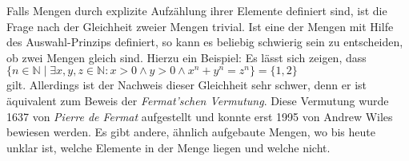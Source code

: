Falls Mengen durch explizite Aufz\"{a}hlung ihrer Elemente definiert sind, ist die Frage nach
der Gleichheit zweier Mengen trivial.  Ist eine der Mengen mit Hilfe des Auswahl-Prinzips definiert, so
kann es beliebig schwierig sein zu entscheiden, ob zwei Mengen gleich sind.  Hierzu ein
Beispiel:  Es l\"{a}sst sich zeigen, dass \\[0.2cm]
\hspace*{1.3cm} 
$\{ n \in \mathbb{N} \mid \exists x, y, z\in\mathbb{N}: x > 0 \wedge y > 0 \wedge x^n + y^n = z^n \} 
= \{1,2\}$ \\[0.2cm]
gilt.  Allerdings ist der Nachweis dieser Gleichheit sehr schwer, denn er ist \"{a}quivalent
zum Beweis der \emph{Fermat'schen Vermutung}. Diese Vermutung wurde 1637
von {\sl Pierre de Fermat} aufgestellt und konnte erst 1995 von Andrew Wiles bewiesen werden.
Es gibt andere, \"{a}hnlich aufgebaute Mengen, wo bis heute unklar ist, welche Elemente in der
Menge liegen und welche nicht.



